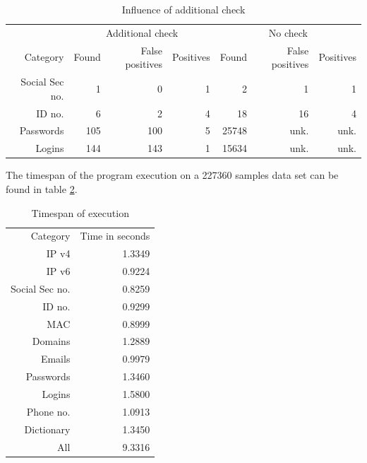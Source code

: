 \documentclass[a4paper,twoside,12pt]{book}
\begin{document}
\begin{table}
   \centering
   \caption{Influence of additional check}
   \label{id:tab:wynikiNoCheck}
   \begin{tabular}{rrrrrrr}
   \toprule
                     &           \multicolumn{3}{c}{Additional check}    &    \multicolumn{3}{c}{No check}\\
                                 \cmidrule(r){2-4}                            \cmidrule(r){5-7}
      Category       &   Found &   False positives & Positives &   Found &   False positives & Positives \\
      Social Sec no. &       1 &                 0 &         1 &       2 &                 1 &         1 \\
      ID no.         &       6 &                 2 &         4 &      18 &                16 &         4 \\
      Passwords      &     105 &               100 &         5 &   25748 &              unk. &      unk. \\
      Logins         &     144 &               143 &         1 &   15634 &              unk. &      unk. \\
   \bottomrule
   \end{tabular}
   \end{table} 


The timespan of the program execution on a 227360 samples data set can be found in table \ref{id:tab:wynikiTime}.

\begin{table}
   \centering
   \caption{Timespan of execution}
   \label{id:tab:wynikiTime}
   \begin{tabular}{rr}
   \toprule
      Category       &  Time in seconds \\
      IP v4          &           1.3349 \\
      IP v6          &           0.9224 \\
      Social Sec no. &           0.8259 \\
      ID no.         &           0.9299 \\
      MAC            &           0.8999 \\
      Domains        &           1.2889 \\
      Emails         &           0.9979 \\
      Passwords      &           1.3460 \\
      Logins         &           1.5800 \\
      Phone no.      &           1.0913 \\
      Dictionary     &           1.3450 \\
      All            &           9.3316 \\  
   \bottomrule
   \end{tabular}
   \end{table}  
\end{document}
